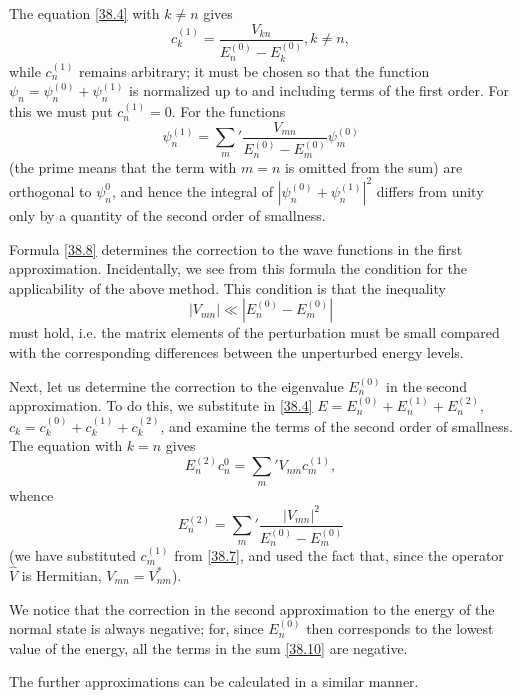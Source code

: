 The equation \eqref{38.4} with $ k \ne n $ gives
\begin{equation}\label{38.7}
c_k^{(1)}=\frac{V_{kn}}{E_n^{(0)}-E_k^{(0)}},k\ne n,
\end{equation}
while $ c_n^{(1)} $ remains arbitrary; it must be chosen so that the function $ \psi_n = \psi_n^{(0)} + \psi_n^{(1)} $ is normalized up to and including terms of the first order. For this we must put $ c_n^{(1)} = 0 $. For the functions
\begin{equation}\label{38.8}
\psi_n^{(1)}={\sum_{m}}'\frac{V_{mn}}{E_n^{(0)}-E_m^{(0)}}\psi_m^{(0)}
\end{equation}
(the prime means that the term with $ m = n $ is omitted from the sum) are orthogonal to $\psi_n^0$, and hence the integral of $ |\psi_n^{(0)}+\psi_n^{(1)}|^2 $ differs from unity only by a quantity of the second order of smallness.

Formula \eqref{38.8} determines the correction to the wave functions in the first approximation. Incidentally, we see from this formula the condition for the applicability of the above method. This condition is that the inequality
\begin{equation}\label{38.9}
|V_{mn}|\ll|E_n^{(0)}-E_m^{(0)}|
\end{equation}
must hold, i.e. the matrix elements of the perturbation must be small compared with the corresponding differences between the unperturbed energy levels.

Next, let us determine the correction to the eigenvalue $ E_n^{(0)} $ in the second approximation. To do this, we substitute in \eqref{38.4} $ E = E_n^{(0)}+E_n^{(1)}+E_n^{(2)} $, $ c_k = c_k^{(0)}+c_k^{(1)}+c_k^{(2)} $, and examine the terms of the second order of smallness. The equation with $ k = n $ gives
\[ E_n^{(2)}c_n^0={\sum_m}'V_{nm}c_m^{(1)}, \]
whence
\begin{equation}\label{38.10}
E_n^{(2)}={\sum_m}'\frac{|V_{mn}|^2}{E_n^{(0)}-E_m^{(0)}}
\end{equation}
(we have substituted $ c_m^{(1)} $ from \eqref{38.7}, and used the fact that, since the operator $\hat{V}$ is Hermitian, $ V_{mn} = V_{nm}^* $).

We notice that the correction in the second approximation to the energy of the normal state is always negative; for, since $ E_n^{(0)} $ then corresponds to the lowest value of the energy, all the terms in the sum \eqref{38.10} are negative.

The further approximations can be calculated in a similar manner.

